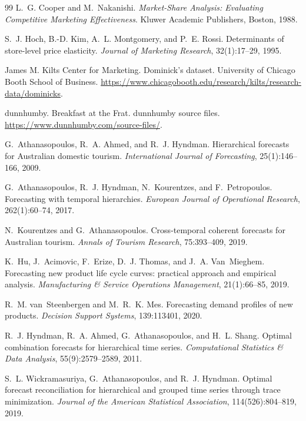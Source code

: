 \begin{thebibliography}{99}
 L.~G. Cooper and M.~Nakanishi. \emph{Market-Share Analysis: Evaluating Competitive Marketing Effectiveness}. Kluwer Academic Publishers, Boston, 1988.

 S.~J. Hoch, B.-D. Kim, A.~L. Montgomery, and P.~E. Rossi. Determinants of store-level price elasticity. \emph{Journal of Marketing Research}, 32(1):17--29, 1995.

 James M. Kilts Center for Marketing. Dominick's dataset. University of Chicago Booth School of Business. \url{https://www.chicagobooth.edu/research/kilts/research-data/dominicks}.

 dunnhumby. Breakfast at the Frat. dunnhumby source files. \url{https://www.dunnhumby.com/source-files/}.

 G.~Athanasopoulos, R.~A. Ahmed, and R.~J. Hyndman. Hierarchical forecasts for Australian domestic tourism. \emph{International Journal of Forecasting}, 25(1):146--166, 2009.

 G.~Athanasopoulos, R.~J. Hyndman, N.~Kourentzes, and F.~Petropoulos. Forecasting with temporal hierarchies. \emph{European Journal of Operational Research}, 262(1):60--74, 2017.

 N.~Kourentzes and G.~Athanasopoulos. Cross-temporal coherent forecasts for Australian tourism. \emph{Annals of Tourism Research}, 75:393--409, 2019.

 K.~Hu, J.~Acimovic, F.~Erize, D.~J. Thomas, and J.~A. Van~Mieghem. Forecasting new product life cycle curves: practical approach and empirical analysis. \emph{Manufacturing \& Service Operations Management}, 21(1):66--85, 2019.

 R.~M. van~Steenbergen and M.~R.~K. Mes. Forecasting demand profiles of new products. \emph{Decision Support Systems}, 139:113401, 2020.

 R.~J. Hyndman, R.~A. Ahmed, G.~Athanasopoulos, and H.~L. Shang. Optimal combination forecasts for hierarchical time series. \emph{Computational Statistics \& Data Analysis}, 55(9):2579--2589, 2011.

 S.~L. Wickramasuriya, G.~Athanasopoulos, and R.~J. Hyndman. Optimal forecast reconciliation for hierarchical and grouped time series through trace minimization. \emph{Journal of the American Statistical Association}, 114(526):804--819, 2019.


\end{thebibliography}

